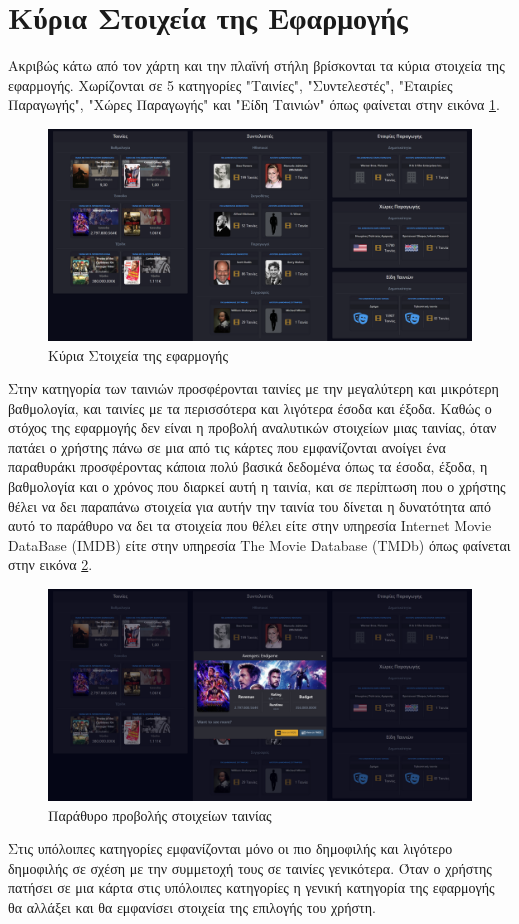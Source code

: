 \section{Κύρια Στοιχεία της Εφαρμογής}
Ακριβώς κάτω από τον χάρτη και την πλαϊνή στήλη βρίσκονται τα κύρια στοιχεία της εφαρμογής. Χωρίζονται σε 5 κατηγορίες "Ταινίες", "Συντελεστές", "Εταιρίες Παραγωγής", "Χώρες Παραγωγής" και "Είδη Ταινιών" όπως φαίνεται στην εικόνα \ref{demo:insights}. 

\begin{figure}[H]
  \centering
  \includegraphics[width=145mm]{Chapters/6 - Manual/Images/main_page_insights.png}
  \caption{Κύρια Στοιχεία της εφαρμογής}
  \label{demo:insights}
\end{figure}

Στην κατηγορία των ταινιών προσφέρονται ταινίες με την μεγαλύτερη και μικρότερη βαθμολογία, και ταινίες με τα περισσότερα και λιγότερα έσοδα και έξοδα. Καθώς ο στόχος της εφαρμογής δεν είναι η προβολή αναλυτικών στοιχείων μιας ταινίας, όταν πατάει ο χρήστης πάνω σε μια από τις κάρτες που εμφανίζονται ανοίγει ένα παραθυράκι προσφέροντας κάποια πολύ βασικά δεδομένα όπως τα έσοδα, έξοδα, η βαθμολογία και ο χρόνος που διαρκεί αυτή η ταινία, και σε περίπτωση που ο χρήστης θέλει να δει παραπάνω στοιχεία για αυτήν την ταινία του δίνεται η δυνατότητα από αυτό το παράθυρο να δει τα στοιχεία που θέλει είτε στην υπηρεσία Internet Movie DataBase (IMDB) είτε στην υπηρεσία The Movie Database (TMDb) όπως φαίνεται στην εικόνα \ref{demo:movie:modal}.

\begin{figure}[H]
  \centering
  \includegraphics[width=145mm]{Chapters/6 - Manual/Images/main_page_insights_modal.png}
  \caption{Παράθυρο προβολής στοιχείων ταινίας}
  \label{demo:movie:modal}
\end{figure}

Στις υπόλοιπες κατηγορίες εμφανίζονται μόνο οι πιο δημοφιλής και λιγότερο δημοφιλής σε σχέση με την συμμετοχή τους σε ταινίες γενικότερα. Όταν ο χρήστης πατήσει σε μια κάρτα στις υπόλοιπες κατηγορίες η γενική κατηγορία της εφαρμογής θα αλλάξει και θα εμφανίσει στοιχεία της επιλογής του χρήστη.


